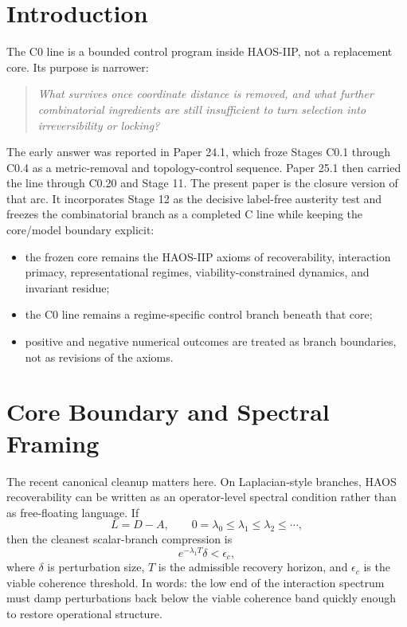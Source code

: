 \documentclass[11pt]{article}
\begin{document}
\begin{abstract}
locking, intrinsic grading, or family-wide recovery on the no-distance branch.
\end{abstract}

\section{Introduction}

The C0 line is a bounded control program inside HAOS-IIP, not a replacement core. Its purpose is narrower:
\begin{quote}
\emph{What survives once coordinate distance is removed, and what further combinatorial ingredients are still insufficient to turn selection into irreversibility or locking?}
\end{quote}

The early answer was reported in Paper 24.1, which froze Stages C0.1 through C0.4 as a metric-removal and topology-control sequence. Paper 25.1 then carried the line through C0.20 and Stage 11. The present paper is the closure version of that arc. It incorporates Stage 12 as the decisive label-free austerity test and freezes the combinatorial branch as a completed C line while keeping the core/model boundary explicit:
\begin{itemize}
\item the frozen core remains the HAOS-IIP axioms of recoverability, interaction primacy, representational regimes, viability-constrained dynamics, and invariant residue;
\item the C0 line remains a regime-specific control branch beneath that core;
\item positive and negative numerical outcomes are treated as branch boundaries, not as revisions of the axioms.
\end{itemize}

\section{Core Boundary and Spectral Framing}

The recent canonical cleanup matters here. On Laplacian-style branches, HAOS recoverability can be written as an operator-level spectral condition rather than as free-floating language. If
\[
L = D-A, \qquad 0=\lambda_0 \le \lambda_1 \le \lambda_2 \le \cdots,
\]
then the cleanest scalar-branch compression is
\[
e^{-\lambda_1 T}\delta < \epsilon_c,
\]
where $\delta$ is perturbation size, $T$ is the admissible recovery horizon, and $\epsilon_c$ is the viable coherence threshold. In words: the low end of the interaction spectrum must damp perturbations back below the viable coherence band quickly enough to restore operational structure.
\end{document}
